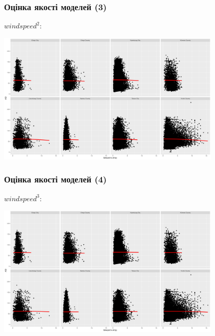 ﻿\documentclass{beamer}
\begin{document}
\begin{frame}
  \frametitle{Оцінка якості моделей (3)}

  $windspeed^2$:

  \includegraphics[height=2.5in]{plots/lab3/windspeed^2-aqi.png}
\end{frame}

\begin{frame}
  \frametitle{Оцінка якості моделей (4)}
  
  $windspeed^3$:

  \includegraphics[height=2.5in]{plots/lab3/windspeed^3-aqi.png}
\end{frame}
\end{document}
